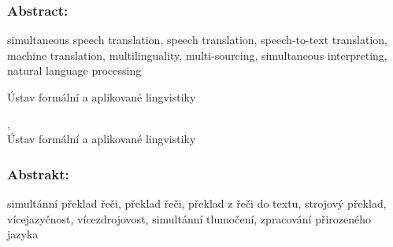 \documentclass[12pt,notitlepage,a4paper,openright]{report}
\begin{document}
\subsubsection{Abstract:}



\begin{description}[leftmargin=7.5em,labelwidth=7em,labelindent=0em,labelsep=0.5em]
\item[Keywords:] simultaneous speech translation, speech translation,
speech-to-text translation, machine translation, multilinguality,
mul\-ti-\-sour\-cing, simultaneous interpreting, natural language processing
\end{description}


\cleardoublepage{}
{}
\begin{description}[leftmargin=7.5em,labelwidth=7em,labelindent=0em,labelsep=0.5em]
\item[Název práce:] \XXX{}
\item[Autor:] \theauthor{}
\item[Pracoviště:] Ústav formální a aplikované lingvistiky
\item[Vedoucí práce:] \thesupervisor,\\ Ústav formální a aplikované lingvistiky
\end{description}

\subsubsection{Abstrakt:}



\begin{description}[leftmargin=7.5em,labelwidth=7em,labelindent=0em,labelsep=0.5em]
%
\item[Klíčová slova:] %
simultánní překlad řeči, překlad řeči, překlad z řeči do textu, strojový
překlad, vícejazyčnost, vícezdrojovost,
simultánní tlumočení, zpracování přirozeného jazyka
%
\end{description}





\cleardoublepage{}
\ \vspace{10mm}
{}
\end{document}
